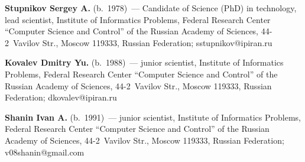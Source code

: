     \vspace*{3pt}
    
    \noindent
    \textbf{Stupnikov Sergey A.} (b.\ 1978)~--- Candidate of Science (PhD) in 
technology, lead scientist, Institute of Informatics Problems, Federal Research 
Center ``Computer Science and Control'' of the Russian Academy of Sciences,  
44-2~Vavilov Str., Moscow 119333, Russian Federation; 
\mbox{sstupnikov@ipiran.ru}
    
    \vspace*{3pt}
    
    \noindent
    \textbf{Kovalev Dmitry Yu.} (b.\ 1988)~--- junior scientist, Institute of 
Informatics Problems, Federal Research Center ``Computer Science and Control'' 
of the Russian Academy of Sciences, 44-2~Vavilov Str.,  Moscow 119333, Russian 
Federation; \mbox{dkovalev@ipiran.ru}
    
    \vspace*{3pt}
    
    \noindent
    \textbf{Shanin Ivan A.} (b.\ 1991)~--- junior scientist, Institute of Informatics 
Problems, Federal Research Center ``Computer Science and Control'' of the 
Russian Academy of Sciences, 44-2~Vavilov Str., Moscow 119333, Russian 
Federation; \mbox{v08shanin@gmail.com}
\label{end\stat}

\renewcommand{\bibname}{\protect\rm Литература} 